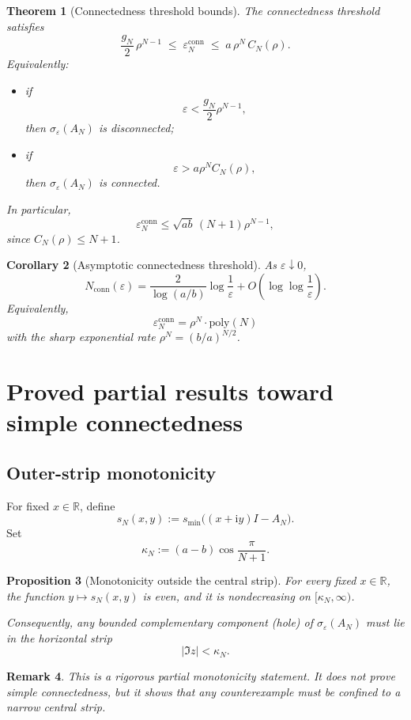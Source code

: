 \documentclass[11pt]{article}
\newtheorem{theorem}{Theorem}[section]
\newtheorem{proposition}[theorem]{Proposition}
\newtheorem{corollary}[theorem]{Corollary}
\newtheorem{remark}[theorem]{Remark}
\newcommand{\R}{\mathbb{R}}
\newcommand{\eps}{\varepsilon}
\newcommand{\sig}{\sigma}
\newcommand{\smin}{s_{\min}}
\newcommand{\conn}{\mathrm{conn}}
\newcommand{\I}{\mathrm{i}}
\begin{document}
\begin{theorem}[Connectedness threshold bounds]
\label{thm:conn-bounds}
The connectedness threshold satisfies
\[
\frac{g_N}{2}\,\rho^{N-1}
\;\le\;
\eps_N^{\conn}
\;\le\;
a\,\rho^N\,C_N(\rho).
\]
Equivalently:

\begin{itemize}
\item if
\[
\eps<\frac{g_N}{2}\rho^{N-1},
\]
then $\sig_\eps(A_N)$ is disconnected;

\item if
\[
\eps>a\rho^N C_N(\rho),
\]
then $\sig_\eps(A_N)$ is connected.
\end{itemize}

In particular,
\[
\eps_N^{\conn}\le \sqrt{ab}\,(N+1)\rho^{N-1},
\]
since $C_N(\rho)\le N+1$.
\end{theorem}

\begin{corollary}[Asymptotic connectedness threshold]
\label{cor:asymptotic-conn}
As $\eps\downarrow 0$,
\[
N_{\conn}(\eps)
=
\frac{2}{\log(a/b)}\log\frac1\eps
+
O\!\left(\log\log\frac1\eps\right).
\]
Equivalently,
\[
\eps_N^{\conn}
=
\rho^N \cdot \mathrm{poly}(N)
\]
with the sharp exponential rate $\rho^N=(b/a)^{N/2}$.
\end{corollary}

\section{Proved partial results toward simple connectedness}

\subsection{Outer-strip monotonicity}

For fixed $x\in\R$, define
\[
s_N(x,y):=\smin\bigl((x+\I y)I-A_N\bigr).
\]
Set
\[
\kappa_N:=(a-b)\cos\frac{\pi}{N+1}.
\]

\begin{proposition}[Monotonicity outside the central strip]
\label{prop:strip}
For every fixed $x\in\R$, the function $y\mapsto s_N(x,y)$ is even, and it is nondecreasing on $[\kappa_N,\infty)$.

Consequently, any bounded complementary component (hole) of $\sig_\eps(A_N)$ must lie in the horizontal strip
\[
|\Im z|<\kappa_N.
\]
\end{proposition}

\begin{remark}
This is a rigorous partial monotonicity statement. It does \emph{not} prove simple connectedness, but it shows that any counterexample must be confined to a narrow central strip.
\end{remark}
\end{document}
